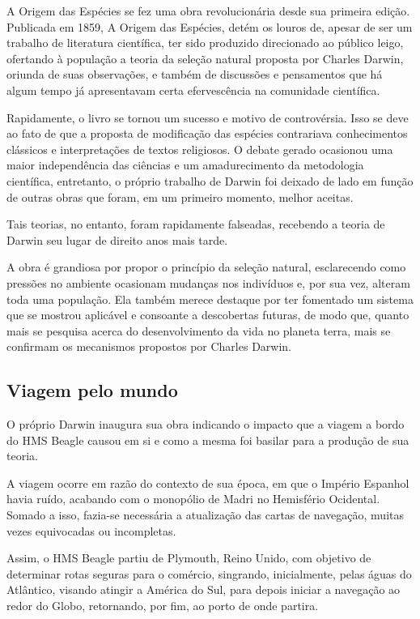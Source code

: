 \documentclass[12pt]{extarticle}
\begin{document}
A Origem das Espécies se fez uma obra revolucionária desde sua primeira
edição. Publicada em 1859, A Origem das Espécies, detém os louros de,
apesar de ser um trabalho de literatura científica, ter sido produzido
direcionado ao público leigo, ofertando à população a teoria da seleção
natural proposta por Charles Darwin, oriunda de suas observações, e
também de discussões e pensamentos que há algum tempo já apresentavam
certa efervescência na comunidade científica.

Rapidamente, o livro se tornou um sucesso e motivo de controvérsia. Isso
se deve ao fato de que a proposta de modificação das espécies
contrariava conhecimentos clássicos e interpretações de textos
religiosos. O debate gerado ocasionou uma maior independência das
ciências e um amadurecimento da metodologia científica, entretanto, o
próprio trabalho de Darwin foi deixado de lado em função de outras obras
que foram, em um primeiro momento, melhor aceitas.

Tais teorias, no entanto, foram rapidamente falseadas, recebendo a
teoria de Darwin seu lugar de direito anos mais tarde.

A obra é grandiosa por propor o princípio da seleção natural,
esclarecendo como pressões no ambiente ocasionam mudanças nos indivíduos
e, por sua vez, alteram toda uma população. Ela também merece destaque
por ter fomentado um sistema que se mostrou aplicável e consoante a
descobertas futuras, de modo que, quanto mais se pesquisa acerca do
desenvolvimento da vida no planeta terra, mais se confirmam os
mecanismos propostos por Charles Darwin.


\subsection{Viagem pelo mundo}

O próprio Darwin inaugura sua obra indicando o impacto que a viagem a
bordo do HMS Beagle causou em si e como a mesma foi basilar para a
produção de sua teoria.

A viagem ocorre em razão do contexto de sua época, em que o Império
Espanhol havia ruído, acabando com o monopólio de Madri no Hemisfério
Ocidental. Somado a isso, fazia-se necessária a atualização das cartas
de navegação, muitas vezes equivocadas ou incompletas.

Assim, o HMS Beagle partiu de Plymouth, Reino Unido, com objetivo de
determinar rotas seguras para o comércio, singrando, inicialmente, pelas
águas do Atlântico, visando atingir a América do Sul, para depois
iniciar a navegação ao redor do Globo, retornando, por fim, ao porto de
onde partira.
\end{document}
